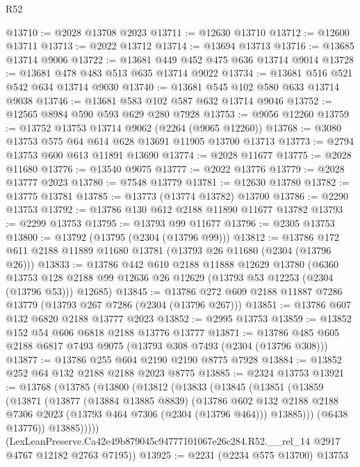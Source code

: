\begin{lexlean}{R52}
\begin{coremodule}
@13710 := @2028 @13708 @2023
@13711 := @12630 @13710
@13712 := @12600 @13711
@13713 := @2022 @13712
@13714 := @13694 @13713
@13716 := @13685 @13714 @9006
@13722 := @13681 @449 @452 @475 @636 @13714 @9014
@13728 := @13681 @478 @483 @513 @635 @13714 @9022
@13734 := @13681 @516 @521 @542 @634 @13714 @9030
@13740 := @13681 @545 @102 @580 @633 @13714 @9038
@13746 := @13681 @583 @102 @587 @632 @13714 @9046
@13752 := @12565 @8984 @590 @593 @629 @280 @7928
@13753 := @9056 @12260
@13759 := @13752 @13753 @13714 @9062 (@2264 (@9065 @12260))
@13768 := @3080 @13753 @575 @64 @614 @628 @13691 @11905 @13700 @13713
@13773 := @2794 @13753 @600 @613 @11891 @13690
@13774 := @2028 @11677
@13775 := @2028 @11680
@13776 := @13540 @9075
@13777 := @2022 @13776
@13779 := @2028 @13777 @2023
@13780 := @7548 @13779
@13781 := @12630 @13780
@13782 := @13775 @13781
@13785 := @13773 (@13774 @13782) @13700
@13786 := @2290 @13753
@13792 := @13786 @130 @612 @2188 @11890 @11677 @13782
@13793 := @2299 @13753
@13795 := @13793 @99 @11677
@13796 := @2305 @13753
@13800 := @13792 (@13795 (@2304 (@13796 @99)))
@13812 := @13786 @172 @611 @2188 @11889 @11680 @13781 (@13793 @26 @11680 (@2304 (@13796 @26)))
@13833 := @13786
    @442
    @610
    @2188
    @11888
    @12629
    @13780
    (@6360 @13753 @128 @2188 @99 @12636 @26 @12629 (@13793 @53 @12253 (@2304 (@13796 @53))) @12685)
@13845 := @13786 @272 @609 @2188 @11887 @7286 @13779 (@13793 @267 @7286 (@2304 (@13796 @267)))
@13851 := @13786 @607 @132 @6820 @2188 @13777 @2023
@13852 := @2995 @13753
@13859 := @13852 @152 @54 @606 @6818 @2188 @13776 @13777
@13871 := @13786 @485 @605 @2188 @6817 @7493 @9075 (@13793 @308 @7493 (@2304 (@13796 @308)))
@13877 := @13786 @255 @604 @2190 @2190 @8775 @7928
@13884 := @13852 @252 @64 @132 @2188 @2188 @2023 @8775
@13885 := @2324 @13753
@13921 := @13768
    (@13785
      (@13800
        (@13812
          (@13833
            (@13845
              (@13851
                (@13859
                  (@13871
                    (@13877
                      (@13884 @13885 @8839)
                      (@13786
                        @602
                        @132
                        @2188
                        @2188
                        @7306
                        @2023
                        (@13793 @464 @7306 (@2304 (@13796 @464)))
                        @13885)))
                  (@6438 @13776))
                @13885)))))
      (LexLeanPreserve.Ca42e49b879045c94777101067e26c284.R52.__rel_14
        @2917
        @4767
        @12182
        @2763
        @7195))
@13925 := @2231 (@2234 @575 @13700) @13753

\end{coremodule}
\end{lexlean}
